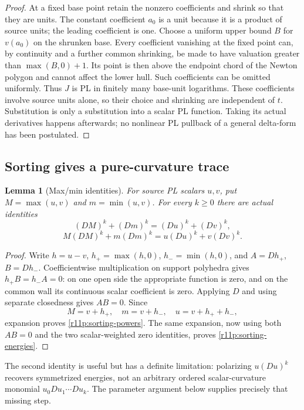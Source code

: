 \documentclass[11pt]{article}
\newtheorem{lemma}[theorem]{Lemma}
\theoremstyle{definition}
\theoremstyle{remark}
\numberwithin{equation}{section}
\begin{document}
\begin{proof}
At a fixed base point retain the nonzero coefficients and shrink so
that they are units.  The constant coefficient $a_0$ is a unit because
it is a product of source units; the leading coefficient is one.
Choose a uniform upper bound $B$ for $v(a_0)$ on the shrunken base.
Every coefficient vanishing at the fixed point can, by continuity and
a further common shrinking, be made to have valuation greater than
$\max(B,0)+1$.  Its point is then above the endpoint chord of the
Newton polygon and cannot affect the lower hull.  Such coefficients
can be omitted uniformly.
Thus $J$ is PL in finitely many base-unit logarithms.  These
coefficients involve source units alone, so their choice and shrinking
are independent of $t$.  Substitution is only a substitution into a
scalar PL function.  Taking its actual derivatives happens afterwards;
no nonlinear PL pullback of a general delta-form has been postulated.
\end{proof}

\subsection{Sorting gives a pure-curvature trace}

\begin{lemma}[Max/min identities]
\label{r11p:sorting}
For source PL scalars $u,v$, put $M=\max(u,v)$ and $m=\min(u,v)$.
For every $k\geq0$ there are actual identities
\[
 (DM)^k+(Dm)^k=(Du)^k+(Dv)^k,
\tag{MT3}\label{r11p:sorting-powers}
\]
\[
 M(DM)^k+m(Dm)^k=u(Du)^k+v(Dv)^k.
\tag{MT4}\label{r11p:sorting-energies}
\]
\end{lemma}

\begin{proof}
Write $h=u-v$, $h_+=\max(h,0)$, $h_-=\min(h,0)$, and
$A=Dh_+$, $B=Dh_-$.  Coefficientwise multiplication on support
polyhedra gives $h_+B=h_-A=0$: on one open side the appropriate
function is zero, and on the common wall its continuous scalar
coefficient is zero.  Applying $D$ and using separate closedness gives
$AB=0$.  Since
\[
 M=v+h_+,\quad m=v+h_-,\quad u=v+h_++h_-,
\]
expansion proves \eqref{r11p:sorting-powers}.  The same expansion,
now using both $AB=0$ and the two scalar-weighted zero identities,
proves \eqref{r11p:sorting-energies}.
\end{proof}

The second identity is useful but has a definite limitation:
polarizing $u(Du)^k$ recovers symmetrized energies, not an arbitrary
ordered scalar-curvature monomial $u_0Du_1\cdots Du_k$.
The parameter argument below supplies precisely that missing step.
\end{document}

